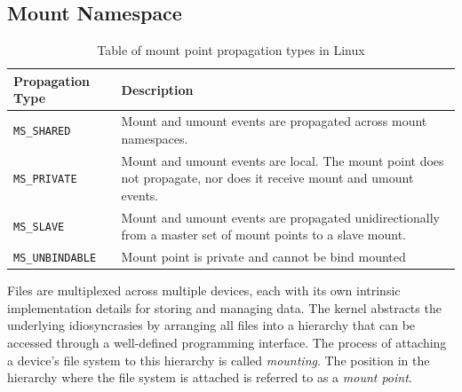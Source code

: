 

\subsection{Mount Namespace}
\label{sections:fundamentals/namespaces/mount}
\begin{table}[h!]
    \centering
    \begin{tabular}{ |m{4cm}|m{20em}| }
        \hline
        Propagation Type & Description \\
        \hline
        \verb|MS_SHARED| & Mount and umount events are propagated across mount namespaces. \\
        \hline 
        \verb|MS_PRIVATE| & Mount and umount events are local. The mount point does not propagate, nor does it receive mount and umount events. \\
        \hline
        \verb|MS_SLAVE| & Mount and umount events are propagated unidirectionally from a master set of mount points to a slave mount. \\
        \hline
        \verb|MS_UNBINDABLE| & Mount point is private and cannot be bind mounted \\
        \hline
    \end{tabular}
    \caption{Table of mount point propagation types in Linux}
    \label{table:fundamentals/namespaces/mount/propagation-types}
\end{table}

Files are multiplexed across multiple devices, each with its own intrinsic implementation details 
for storing and managing data. The kernel abstracts the underlying idiosyncrasies 
by arranging all files into a hierarchy that can be accessed through a well-defined programming interface. 
The process of attaching a device's file system 
to this hierarchy is called \textit{mounting}. The position in the hierarchy where the file system 
is attached is referred to as a \textit{mount point}.

